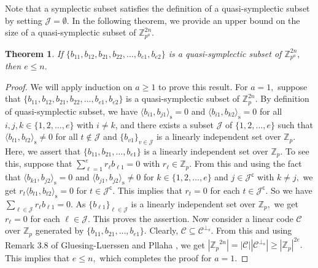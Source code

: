 \documentclass{article}
\newtheorem{thm}{Theorem}[section]
\theoremstyle{remark}
\theoremstyle{definition}
\numberwithin{equation}{section}
\begin{document}
Note that a symplectic subset satisfies the definition of a quasi-symplectic subset by setting $\mathcal{J} = \emptyset$. In the following theorem, we provide an upper bound on the size of a quasi-symplectic subset of ${\mathbb{Z}^{2n}_{p^a}}.$
\begin{thm} \label{tquasi} If $\{b_{11},b_{12},b_{21},b_{22},\ldots,b_{e1},b_{e2}\}$ is a quasi-symplectic subset of ${\mathbb{Z}^{2n}_{p^a}},$ then $e \leq n.$ 
\end{thm}
\begin{proof} We will apply induction on $a \geq 1$ to prove this result. For $a=1,$ suppose that $\{b_{11},b_{12},b_{21},b_{22},\ldots,b_{e1},b_{e2}\}$ is a quasi-symplectic subset of ${\mathbb{Z}^{2n}_{p}}$. By definition of quasi-symplectic subset, we have $\langle b_{i1}, b_{j1} \rangle_{\text{s}}=0$ and $\langle b_{i1}, b_{k 2} \rangle_{\text{s}}=0$ for all $i ,j, k  \in \{1,2,\ldots,e\}$ with $i \neq k$, and there exists a subset $\mathcal{J}$ of $\{1,2,\ldots,e \}$ such that $\langle b_{t1}, b_{t2} \rangle_{\text{s}}\neq0$ for all $ t \not\in \mathcal{J}$ and $\{b_{v1} \}_{v \in \mathcal{J}}$ is a linearly independent set over $\mathbb{Z}_p$. Here, we assert that $\{b_{11},b_{21},\ldots,b_{e1}\}$ is a linearly independent set over $\mathbb{Z}_p.$ To see this, suppose that $\sum\limits_{\ell=1}^{e}r_\ell b_{\ell 1} =0$ with $r_\ell \in \mathbb{Z}_p.$ From this and using the fact that $\langle b_{k1}, b_{j2}\rangle_{\text{s}} =0$ and $\langle b_{j1}, b_{j2}\rangle_{\text{s}} \neq 0$ for $k \in \{1,2,\ldots,e\}$ and $j \in \mathcal{J}^\mathsf{c}$ with $k \neq j,$ we get $r_t\langle b_{t1}, b_{t2}\rangle_{\text{s}} =0$ for $t \in \mathcal{J}^\mathsf{c}.$ This implies that $r_t=0$ for each $t \in \mathcal{J}^\mathsf{c}.$ So we have $\sum\limits_{ \ell \in \mathcal{J}}^{}  r_\ell b_{\ell 1} =0.$ As $\{b_{\ell 1}\}_{\ell \in \mathcal{J}}$ is a linearly independent set over $\mathbb{Z}_p,$ we get $r_\ell =0$ for each $\ell \in \mathcal{J}.$ This proves the assertion. Now consider a linear code $\mathcal{C}$ over $\mathbb{Z}_p$ generated by  $\{b_{11},b_{21},\ldots,b_{e1}\}.$ Clearly, $\mathcal{C} \subseteq \mathcal{C}^{\perp_{\mathrm{s}}}.$ From this and using Remark 3.8 of  Gluesing-Luerssen and Pllaha  \cite{luerssen}, we get $|{\mathbb{Z}_p}^{2n}|=|\mathcal{C}||\mathcal{C}^{\perp_{\mathrm{s}}}|\geq |{\mathbb{Z}_p}|^{2e}.$ This implies that $e \leq n,$ which completes the proof for $a=1.$ 


\end{proof}
\end{document}
